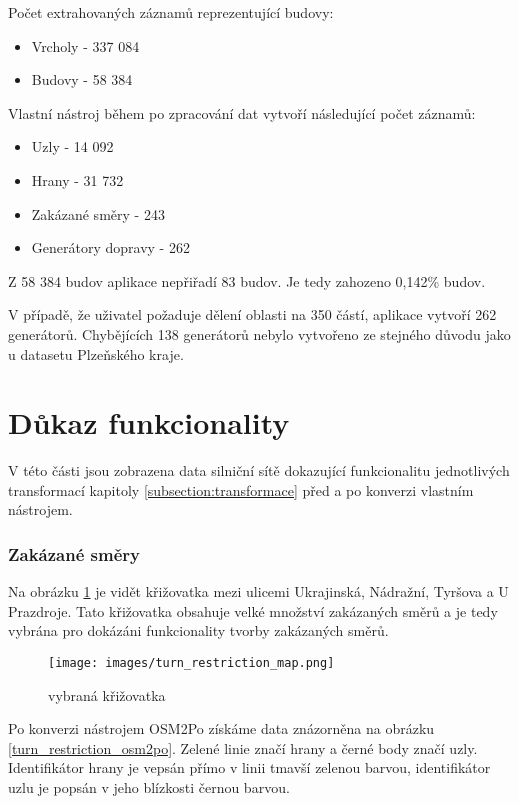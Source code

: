 Počet extrahovaných záznamů reprezentující budovy: 

\begin{itemize}
	\item Vrcholy - 337 084
	\item Budovy - 58 384
\end{itemize}

Vlastní nástroj během po zpracování dat vytvoří následující počet záznamů:

\begin{itemize}
	\item Uzly - 14 092 
	\item Hrany - 31 732
	\item Zakázané směry - 243
	\item Generátory dopravy - 262
\end{itemize}

Z 58 384 budov aplikace nepřiřadí 83 budov. Je tedy zahozeno 0,142\% budov. 

V případě, že uživatel požaduje dělení oblasti na 350 částí, aplikace vytvoří 262 generátorů. Chybějících 138 generátorů nebylo vytvořeno ze stejného důvodu jako u datasetu Plzeňského kraje.

\section{Důkaz funkcionality}

V této části jsou zobrazena data silniční sítě dokazující funkcionalitu jednotlivých transformací kapitoly \ref{subsection:transformace} před a po konverzi vlastním nástrojem.

\subsubsection{Zakázané směry}

Na obrázku \ref{turn_restriction_map} je vidět křižovatka mezi ulicemi Ukrajinská, Nádražní, Tyršova a U Prazdroje. Tato křižovatka obsahuje velké množství zakázaných směrů a je tedy vybrána pro dokázáni funkcionality tvorby zakázaných směrů.

\begin{figure}[htbp]
\centering
\texttt{[image: images/turn\_restriction\_map.png]}
\caption{vybraná křižovatka}
\label{turn_restriction_map}
\end{figure}

Po konverzi nástrojem OSM2Po získáme data znázorněna na obrázku \ref{turn_restriction_osm2po}. Zelené linie značí hrany a černé body značí uzly. Identifikátor hrany je vepsán přímo v linii tmavší zelenou barvou, identifikátor uzlu je popsán v jeho blízkosti černou barvou. 


